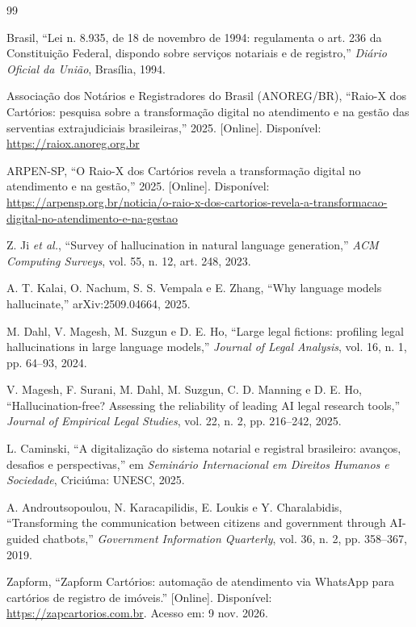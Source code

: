 \documentclass[conference]{IEEEtran}
\begin{document}
\begin{thebibliography}{99}
\footnotesize

Brasil, ``Lei n. 8.935, de 18 de novembro de 1994: regulamenta o art. 236 da Constituição Federal, dispondo sobre serviços notariais e de registro,'' \emph{Diário Oficial da União}, Brasília, 1994.

Associação dos Notários e Registradores do Brasil (ANOREG/BR), ``Raio-X dos Cartórios: pesquisa sobre a transformação digital no atendimento e na gestão das serventias extrajudiciais brasileiras,'' 2025. [Online]. Disponível: \url{https://raiox.anoreg.org.br}

ARPEN-SP, ``O Raio-X dos Cartórios revela a transformação digital no atendimento e na gestão,'' 2025. [Online]. Disponível: \url{https://arpensp.org.br/noticia/o-raio-x-dos-cartorios-revela-a-transformacao-digital-no-atendimento-e-na-gestao}

Z. Ji \emph{et al.}, ``Survey of hallucination in natural language generation,'' \emph{ACM Computing Surveys}, vol. 55, n. 12, art. 248, 2023.

A. T. Kalai, O. Nachum, S. S. Vempala e E. Zhang, ``Why language models hallucinate,'' arXiv:2509.04664, 2025.

M. Dahl, V. Magesh, M. Suzgun e D. E. Ho, ``Large legal fictions: profiling legal hallucinations in large language models,'' \emph{Journal of Legal Analysis}, vol. 16, n. 1, pp. 64--93, 2024.

V. Magesh, F. Surani, M. Dahl, M. Suzgun, C. D. Manning e D. E. Ho, ``Hallucination-free? Assessing the reliability of leading AI legal research tools,'' \emph{Journal of Empirical Legal Studies}, vol. 22, n. 2, pp. 216--242, 2025.

L. Caminski, ``A digitalização do sistema notarial e registral brasileiro: avanços, desafios e perspectivas,'' em \emph{Seminário Internacional em Direitos Humanos e Sociedade}, Criciúma: UNESC, 2025.

A. Androutsopoulou, N. Karacapilidis, E. Loukis e Y. Charalabidis, ``Transforming the communication between citizens and government through AI-guided chatbots,'' \emph{Government Information Quarterly}, vol. 36, n. 2, pp. 358--367, 2019.

Zapform, ``Zapform Cartórios: automação de atendimento via WhatsApp para cartórios de registro de imóveis.'' [Online]. Disponível: \url{https://zapcartorios.com.br}. Acesso em: 9 nov. 2026.


\end{thebibliography}
\end{document}
